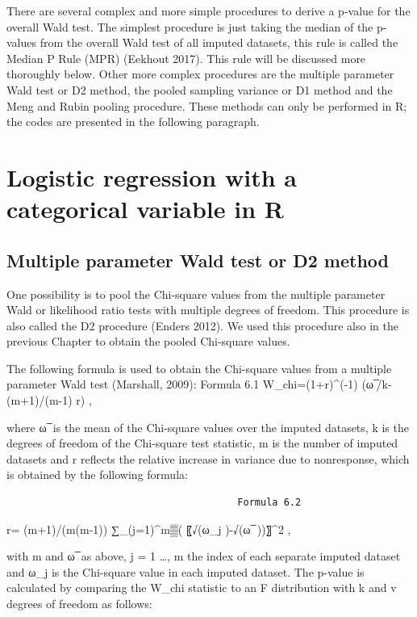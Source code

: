 \documentclass[]{book}
\theoremstyle{definition}
\theoremstyle{definition}
\theoremstyle{definition}
\theoremstyle{remark}
\begin{document}
There are several complex and more simple procedures to derive a p-value
for the overall Wald test. The simplest procedure is just taking the
median of the p-values from the overall Wald test of all imputed
datasets, this rule is called the Median P Rule (MPR) (Eekhout 2017).
This rule will be discussed more thoroughly below. Other more complex
procedures are the multiple parameter Wald test or D2 method, the pooled
sampling variance or D1 method and the Meng and Rubin pooling procedure.
These methods can only be performed in R; the codes are presented in the
following paragraph.

\section{Logistic regression with a categorical variable in
R}\label{logistic-regression-with-a-categorical-variable-in-r}

\subsection{Multiple parameter Wald test or D2
method}\label{multiple-parameter-wald-test-or-d2-method}

One possibility is to pool the Chi-square values from the multiple
parameter Wald or likelihood ratio tests with multiple degrees of
freedom. This procedure is also called the D2 procedure (Enders 2012).
We used this procedure also in the previous Chapter to obtain the pooled
Chi-square values.

The following formula is used to obtain the Chi-square values from a
multiple parameter Wald test (Marshall, 2009): Formula 6.1
W\_chi=(1+r)\^{}(-1) (ω ̅/k-(m+1)/(m-1) r) ,

where ω ̅ is the mean of the Chi-square values over the imputed datasets,
k is the degrees of freedom of the Chi-square test statistic, m is the
number of imputed datasets and r reflects the relative increase in
variance due to nonresponse, which is obtained by the following formula:

\begin{verbatim}
                                        Formula 6.2
\end{verbatim}

r= (m+1)/(m(m-1)) ∑\_(j=1)\^{}m▒( 〖√(ω\_j )-√(ω ̅ ))〗\^{}2 ,

with m and ω ̅ as above, j = 1 \ldots{}, m the index of each separate
imputed dataset and ω\_j is the Chi-square value in each imputed
dataset. The p-value is calculated by comparing the W\_chi statistic to
an F distribution with k and v degrees of freedom as follows:
\end{document}
